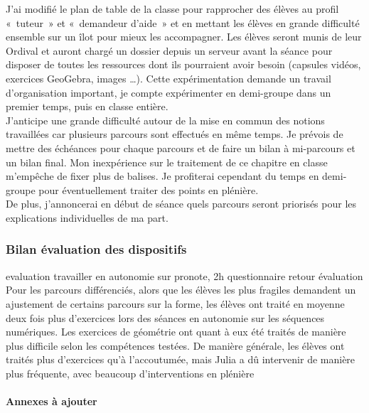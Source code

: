 J'ai modifié le plan de table de la classe pour rapprocher des élèves au profil « tuteur » et « demandeur d'aide » et en mettant les élèves en grande difficulté ensemble sur un îlot pour mieux les accompagner.
Les élèves seront munis de leur Ordival et auront chargé un dossier depuis un serveur avant la séance pour disposer de toutes les ressources dont ils pourraient avoir besoin (capsules vidéos, exercices GeoGebra, images \ldots).
Cette expérimentation demande un travail d'organisation important, je compte expérimenter en demi-groupe dans un premier temps, puis en classe entière.\\
J'anticipe une grande difficulté autour de la mise en commun des notions travaillées car plusieurs parcours sont effectués en même temps. Je prévois de mettre des échéances pour chaque parcours et de faire un bilan à mi-parcours et un bilan final. Mon inexpérience sur le traitement de ce chapitre en classe m'empêche de fixer plus de balises. Je profiterai cependant du temps en demi-groupe pour éventuellement traiter des points en plénière.\\
De plus, j'annoncerai en début de séance quels parcours seront priorisés pour les explications individuelles de ma part.

\subsubsection{Bilan évaluation des dispositifs}\label{retour_parcours}
evaluation travailler en autonomie sur pronote, 2h
questionnaire
retour évaluation
Pour les parcours différenciés, alors que les élèves les plus fragiles demandent un ajustement de certains parcours sur la forme, les élèves ont traité en moyenne deux fois plus d'exercices lors des séances en autonomie sur les séquences numériques. Les exercices de géométrie ont quant à eux été traités de manière plus difficile selon les compétences testées. De manière générale, les élèves ont traités plus d'exercices qu'à l'accoutumée, mais Julia a dû intervenir de manière plus fréquente, avec beaucoup d'interventions en plénière
\paragraph{Annexes à ajouter}
